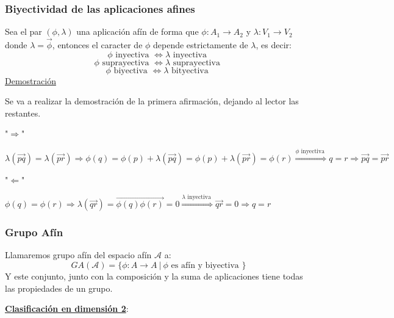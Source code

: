 \documentclass[10pt,a4paper,openright]{book}
\theoremstyle{break}
\begin{document}
\subsubsection*{Biyectividad de las aplicaciones afines}
Sea el par $(\phi, \lambda)$ una aplicación afín de forma que $\phi: A_1 \to A_2$ y $\lambda: V_1 \to V_2$ donde $\lambda = \vec{\phi}$, entonces el caracter de $\phi$ depende estrictamente de $\lambda$, es decir:
$$\phi \mbox{ inyectiva } \Leftrightarrow \lambda \mbox{ inyectiva } $$
$$\phi \mbox{ suprayectiva } \Leftrightarrow \lambda \mbox{ suprayectiva } $$
$$\phi \mbox{ biyectiva } \Leftrightarrow \lambda \mbox{ bityectiva } $$
\underline{Demostración}

Se va a realizar la demostración de la primera afirmación, dejando al lector las restantes.

"$\Rightarrow$"

$\lambda (\vec{pq}) = \lambda (\vec{pr}) \Rightarrow  \phi(q) = \phi(p) + \lambda(\vec{pq}) = \phi(p) + \lambda(\vec{pr}) = \phi(r) \overset{\phi \mbox{ inyectiva }}{\Rightarrow} q = r \Rightarrow \vec{pq} = \vec{pr}$

"$\Leftarrow$"

$\phi(q) = \phi(r) \Rightarrow \lambda (\vec{qr}) = \overrightarrow{\phi(q) \phi(r)} = 0 \overset{\lambda \mbox{ inyectiva }}{\Rightarrow} \vec{qr} = 0 \Rightarrow q = r$


\subsubsection*{Grupo Afín}
Llamaremos grupo afín del espacio afín $\mathcal{A}$ a:
$$GA(\mathcal{A}) = \{\phi : A \to A \ | \ \phi \mbox{ es afín y biyectiva }\}$$
Y este conjunto, junto con la composición y la suma de aplicaciones tiene todas las propiedades de un grupo.

\underline{\textbf{Clasificación en dimensión 2}}:
\end{document}
